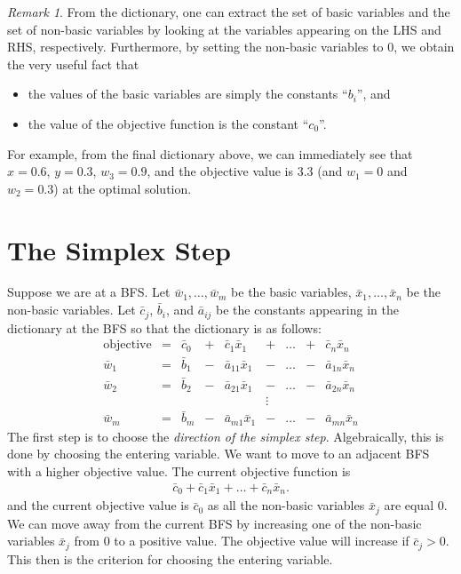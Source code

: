 \documentclass[
]{book}
\providecommand{\tightlist}{%
  \setlength{\itemsep}{0pt}\setlength{\parskip}{0pt}}
\theoremstyle{definition}
\theoremstyle{definition}
\theoremstyle{definition}
\theoremstyle{definition}
\theoremstyle{remark}
\newtheorem*{remark}{Remark}
\begin{document}
\begin{remark}
From the dictionary, one can extract the set of basic variables and the set of non-basic variables by looking at the variables appearing on the LHS and RHS, respectively. Furthermore, by setting the non-basic variables to 0, we obtain the very useful fact that

\begin{itemize}
\tightlist
\item
  the values of the basic variables are simply the constants ``\(b_i\)'', and
\item
  the value of the objective function is the constant ``\(c_0\)''.
\end{itemize}

For example, from the final dictionary above, we can immediately see that \(x = 0.6\), \(y = 0.3\), \(w_3 = 0.9\), and the objective value is \(3.3%
\) (and \(w_1 = 0\) and \(w_2 = 0.3\)) at the optimal solution.
\end{remark}

\hypertarget{the-simplex-step}{%
\section{The Simplex Step}\label{the-simplex-step}}

Suppose we are at a BFS. Let \(\bar{w}_1, \dots, \bar{w}_m\) be the basic variables, \(\bar{x}_1, \dots, \bar{x}_n\) be the non-basic variables. Let \(\bar{c}_j\), \(\bar{b}_i\), and \(\bar{a}_{ij}\) be the constants appearing in the dictionary at the BFS so that the dictionary is as follows:
\begin{equation}
  \begin{array}{rrrrrrrrrr}
  \mbox{objective} & = & \bar{c}_0 & + & \bar{c}_1\bar{x}_1 & + & \dots & + & \bar{c}_n\bar{x}_n \\
      \bar{w}_1 & = & \bar{b}_1 & - & \bar{a}_{11} \bar{x}_1 & - & \dots & - & \bar{a}_{1n} \bar{x}_n \\
      \bar{w}_2 & = & \bar{b}_2 & - & \bar{a}_{21} \bar{x}_1 & - & \dots & - & \bar{a}_{2n} \bar{x}_n \\
      & & & & & \vdots &  \\
      \bar{w}_m & = & \bar{b}_m & - & \bar{a}_{m1} \bar{x}_1 & - & \dots & - & \bar{a}_{mn} \bar{x}_n 
  \end{array} 
  \label{eq:standard-dictionary}
\end{equation}
The first step is to choose the \emph{direction of the simplex step}.
Algebraically, this is done by choosing the entering variable.
We want to move to an adjacent BFS with a higher objective value. The current objective function is
\begin{align*}
  \bar{c}_0  +  \bar{c}_1\bar{x}_1  +  \dots  +  \bar{c}_n\bar{x}_n.
\end{align*}
and the current objective value is \(\bar{c}_0\) as all the non-basic variables \(\bar{x}_j\) are equal 0.
We can move away from the current BFS by increasing one of the non-basic variables \(\bar{x}_j\) from 0 to a positive value. The objective value will increase if \(\bar{c}_j > 0\). This then is the criterion for choosing the entering variable.
\end{document}
